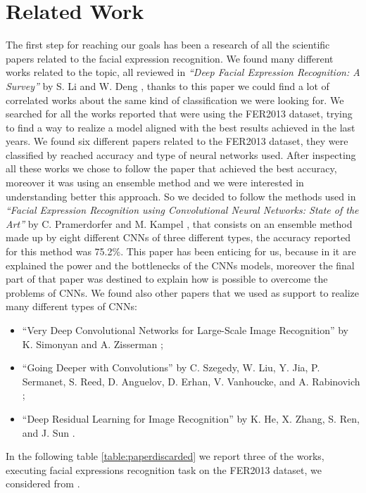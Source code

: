 \documentclass[10pt,twocolumn,letterpaper]{article}
\begin{document}
\section{Related Work}
The first step for reaching our goals has been a research of all the scientific papers related to the facial expression recognition. We found many different works related to the topic, all reviewed in \textit{``Deep Facial Expression Recognition: A Survey''} by S. Li and W. Deng \cite{paper}, thanks to this paper we could find a lot of correlated works about the same kind of classification we were looking for. We searched for all the works reported that were using the FER2013 dataset, trying to find a way to realize a model aligned with the best results achieved in the last years. We found six different papers related to the FER2013 dataset, they were classified by reached accuracy and type of neural networks used. After inspecting all these works we chose to follow the paper that achieved the best accuracy, moreover it was using an ensemble method and we were interested in understanding better this approach. So we decided to follow the methods used in \textit{``Facial Expression Recognition using Convolutional Neural Networks: State of the Art''} by C. Pramerdorfer and M. Kampel \cite{147}, that consists on an ensemble method made up by eight different CNNs of three different types, the accuracy reported for this method was 75.2\%. This paper has been enticing for us, because in it are explained the power and the bottlenecks of the CNNs models, moreover the final part of that paper was destined to explain how is possible to overcome the problems of CNNs. We found also other papers that we used as support to realize many different types of CNNs:
\begin{itemize}
   \item ``Very Deep Convolutional Networks
         for Large-Scale Image Recognition'' by K. Simonyan and A. Zisserman \cite{24};
   \item ``Going Deeper with Convolutions'' by C. Szegedy, W. Liu, Y. Jia, P. Sermanet, S. Reed, D. Anguelov, D. Erhan,
         V. Vanhoucke, and A. Rabinovich \cite{13};
   \item ``Deep Residual Learning for Image Recognition'' by K. He, X. Zhang, S. Ren, and J. Sun \cite{5}.
\end{itemize}
In the following table \ref{table:paperdiscarded} we report three of the works, executing facial expressions recognition task on the FER2013 dataset, we considered from \cite{paper}.
\end{document}
